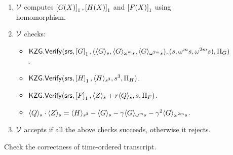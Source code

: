 \begin{figure}[htbp]
\begin{mdframed}
{\begin{enumerate}[leftmargin=1em, label=\arabic*.]
\begin{itemize}[leftmargin=1em]
                \item $\Pi_F=\kzgprove(\srs,F(X),s)$ where $F(X)=Z(X) + rQ(X)$.
            \end{itemize}
            \item $\verifier$ computes $\gone{G(X)},\gone{H(X)}$ and $\gone{F(X)}$ using homomorphism.
            \item $\verifier$ checks:
            \begin{itemize}[leftmargin=1em]
                \item $\kzgverify(\srs,\gone{G}, (\val{s}{G}, \val{\omega^m s}{G}, \val{\omega^{2m} s}{G}),\\(s,\omega^m s, \omega^{2m}s),\Pi_G)$.
                \item $\kzgverify(\srs,\gone{H}, \val{s^3}{H}, s^3, \Pi_H)$.
                \item $\kzgverify(\srs,\gone{F}, \val{s}{Z} + r\val{s}{Q}, s, \Pi_F)$.
                \item $\val{s}{Q}\cdot \val{s}{Z} = \val{s^3}{H}-\val{s}{G}-\gamma \val{\omega^m s}{G}-\gamma^2\val{\omega^{2m}s}{G}$.
            \end{itemize}
            \item $\verifier$ accepts if all the above checks succeeds, otherwise it rejects.
        \end{enumerate}
    }
    \end{mdframed}
    \caption{Check the correctness of time-ordered transcript.}
    \label{fig:time-ordered-transcript}
\end{figure}

